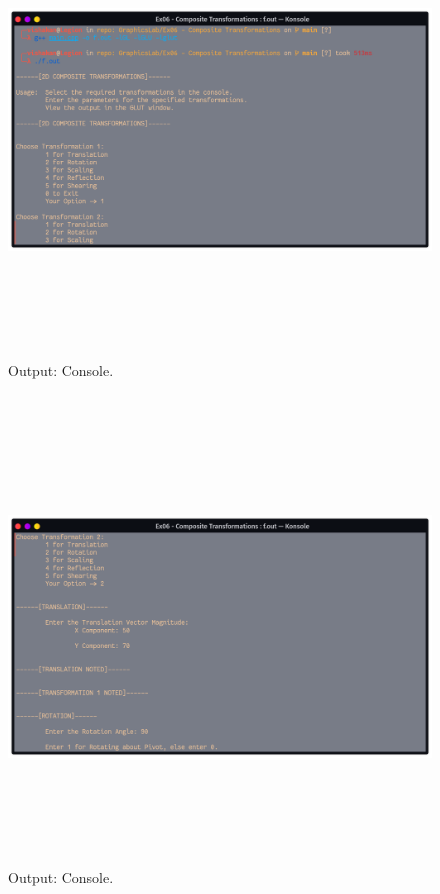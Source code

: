 \documentclass[12pt, a4]{article}
\begin{document}
\subsection*{}
\begin{figure}[h]
\centering
\caption{Output: Console.}
\includegraphics[height=12cm, width=17cm]{Outputs/Console-1.png}
\end{figure}

\newpage
\subsection*{}
\begin{figure}[h]
\centering
\caption{Output: Console.}
\includegraphics[height=12cm, width=17cm]{Outputs/Console-2.png}
\end{figure}
\end{document}
